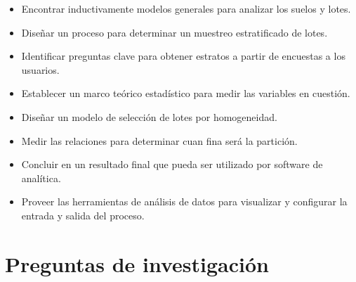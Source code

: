 \documentclass{report}
\begin{document}
\begin{itemize}
    \item Encontrar inductivamente modelos generales para analizar los suelos y lotes. 
    
    \item Diseñar un proceso para determinar un muestreo estratificado de lotes.
    
    \item Identificar preguntas clave para obtener estratos a partir de encuestas a los usuarios.
    
    \item Establecer un marco teórico estadístico para medir las variables en cuestión.
    
    \item Diseñar un modelo de selección de lotes por homogeneidad.
    
    \item Medir las relaciones para determinar cuan fina será la partición.
    
    \item Concluir en un resultado final que pueda ser utilizado por software de analítica.
    
    \item Proveer las herramientas de análisis de datos para visualizar y configurar la entrada y salida del proceso.
\end{itemize}


\section{Preguntas de investigación}
\end{document}
